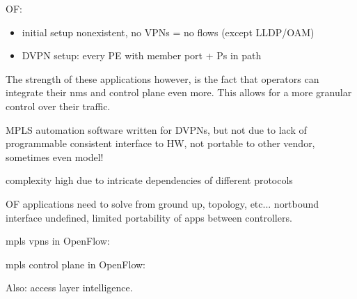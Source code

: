 OF:
\begin{itemize}
	\item initial setup nonexistent, no VPNs = no flows (except LLDP/OAM)
	\item DVPN setup: every PE with member port + Ps in path
\end{itemize}

\HRule

The strength of these applications however, is the fact that operators can integrate their \ac{nms} and control plane even more. This allows for a more granular control over their traffic.

MPLS automation software written for DVPNs, but not due to lack of programmable consistent interface to HW, not portable to other vendor, sometimes even model!

complexity high due to intricate dependencies of different protocols

\HRule

OF applications need to solve from ground up, topology, etc... nortbound interface undefined, limited portability of apps between controllers. 


\ac{mpls} \acp{vpn} in OpenFlow: \cite{mpls-vpn-openflow}

\ac{mpls} control plane in OpenFlow: \cite{mpls-open}

Also: access layer intelligence.













